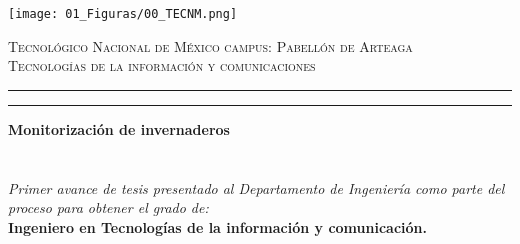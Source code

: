 \documentclass[12pt]{report}
\begin{document}
\begin{titlepage}
\begin{minipage}[c]{0.15\textwidth}
  \centering
  \texttt{[image: 01\_Figuras/00\_TECNM.png]}
\end{minipage}
\hfill %
\begin{minipage}[c]{0.8\textwidth}
    \centering
        \textsc{\large Tecnológico Nacional de México campus: Pabellón de Arteaga}\\[0.3cm]
        \textsc{\large Tecnologías de la información y comunicaciones}\\[0.3cm]
        \hrule height1pt
        \vspace{0.1cm}
        \hrule height2pt
        \vspace{0.3cm}
\end{minipage}

\begin{minipage}[c]{0.15\textwidth}
    \vspace{0.5cm}
    \hspace{0.5cm}
    \vrule width1pt height15cm 
    \hspace{0.05cm}
    \vrule width2pt height15cm
\end{minipage}
\hfill %
\begin{minipage}[c]{0.8\textwidth}
    \centering
        \textbf{\large Monitorización de invernaderos }\\[1cm]
        \\[1cm]
        \\[1cm]
        \textit{\large Primer avance de tesis presentado al Departamento de Ingeniería como parte del proceso para obtener el grado de:}\\[1cm]
        \textbf{\Large Ingeniero en Tecnologías de la información y comunicación.}\\[1cm]
        \\[1cm]
        \\[1cm]
\end{minipage}

\begin{minipage}[c]{0.15\textwidth}
  \centering
\end{minipage}
\hfill %
\begin{minipage}[c]{0.8\textwidth}
    \centering
\end{minipage}

\end{titlepage}
\end{document}
